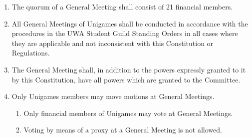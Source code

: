 \documentclass[a4paper]{article}
\begin{document}
\begin{enumerate}
    \item The quorum of a General Meeting shall consist of 21 financial members.
    \item All General Meetings of Unigames shall be conducted in accordance with the procedures in the UWA Student Guild Standing Orders in all cases where they are applicable and not inconsistent with this Constitution or Regulations.
    \item The General Meeting shall, in addition to the powers expressly granted to it by this Constitution, have all powers which are granted to the Committee.
    \item Only Unigames members may move motions at General Meetings.
          \begin{enumerate}
              \item Only financial members of Unigames may vote at General Meetings.
              \item Voting by means of a proxy at a General Meeting is not allowed.
          \end{enumerate}
\end{enumerate}
\end{document}
